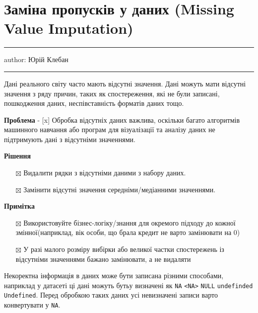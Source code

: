 \documentclass[
  letterpaper,
  DIV=11,
  numbers=noendperiod]{scrreprt}
\providecommand{\tightlist}{%
  \setlength{\itemsep}{0pt}\setlength{\parskip}{0pt}}\usepackage{longtable,booktabs,array}
\begin{document}
\chapter{Заміна пропусків у даних (Missing Value
Imputation)}\label{ux437ux430ux43cux456ux43dux430-ux43fux440ux43eux43fux443ux441ux43aux456ux432-ux443-ux434ux430ux43dux438ux445-missing-value-imputation}

\begin{center}\rule{0.5\linewidth}{0.5pt}\end{center}

author: Юрій Клебан

\begin{center}\rule{0.5\linewidth}{0.5pt}\end{center}

Дані реального світу часто мають відсутні значення. Дані можуть мати
відсутні значення з ряду причин, таких як спостереження, які не були
записані, пошкодження даних, неспівставність форматів даних тощо.

\textbf{Проблема} - {[}x{]} Обробка відсутніх даних важлива, оскільки
багато алгоритмів машинного навчання або програм для візуалізації та
аналізу даних не підтримують дані з відсутніми значеннями.

\textbf{Рішення}

\begin{itemize}
\tightlist
\item[$\boxtimes$]
  Видалити рядки з відсутніми даними з набору даних.
\item[$\boxtimes$]
  Замінити відсутні значення середніми/медіанними значеннями.
\end{itemize}

\textbf{Примітка}

\begin{itemize}
\tightlist
\item[$\boxtimes$]
  Використовуйте бізнес-логіку/знання для окремого підходу до кожної
  змінної(наприклад, вік особи, що брала кредит не варто замінювати на
  0)
\item[$\boxtimes$]
  У разі малого розміру вибірки або великої частки спостережень із
  відсутніми значеннями бажано замінювати, а не видаляти
\end{itemize}

Некоректна інформація в даних може бути записана різними способами,
наприклад у датасеті ці дані можуть бутьу визначені як \texttt{NA}
\texttt{\textless{}NA\textgreater{}} \texttt{NULL} \texttt{undefinded}
\texttt{Undefined}. Перед обробкою таких даних усі невизначені записи
варто конвертувати у \texttt{NA}.
\end{document}
